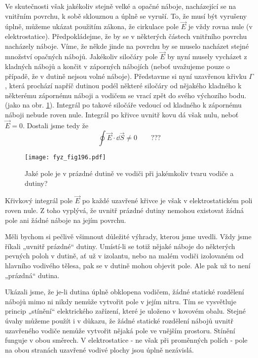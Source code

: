 {  Ve skutečnosti však jakékoliv stejně velké a opačné náboje, nacházející se na vnitřním 
  povrchu, k sobě sklouznou a úplně se vyruší. To, že musí být vyrušeny úplně, můžeme ukázat 
  použitím zákona, že cirkulace pole \(\vec{E}\) je vždy rovna nule (v elektrostatice). 
  Předpokládejme, že by se v některých částech vnitřního povrchu nacházely náboje. Víme, že 
  někde jinde na povrchu by se muselo nacházet stejné množství  opačných nábojů. Jakékoliv 
  siločáry pole \(\vec{E}\) by nyní musely vycházet z kladných nábojů a končit v záporných 
  nábojích (neboť uvažujeme pouze o případě, že v dutině nejsou volné náboje). Představme si 
  nyní uzavřenou křivku \(\Gamma\), která prochází napříč dutinou podél některé siločáry od 
  nějakého kladného k některému zápornému náboji a vodičem se vrací zpět do svého výchozího 
  bodu. (jako na obr. \ref{fyz:fig196}). Integrál po takové siločáře vedoucí od kladného k 
  zápornému náboji nebude roven nule. Integrál po křivce uvnitř kovu dá však nulu, 
  neboť \(\vec{E}=0\). Dostali jsme tedy že
  \begin{equation}\label{fyz:eq_fey_elstat_gauss08}
    \oint \vec{E}\cdot\dd{\vec{S}} \neq 0  \qquad ???
  \end{equation}

  \begin{figure}[ht!] %
    \centering
    \texttt{[image: fyz\_fig196.pdf]}
    \caption{Jaké pole je v prázdné dutině ve vodiči při jakémkoliv tvaru vodiče a dutiny?}
    \label{fyz:fig196}
  \end{figure}
  Křivkový integrál pole \(\vec{E}\) po každé uzavřené křivce je však v elektrostatickém poli 
  roven nule. Z toho vyplývá, že uvnitř prázdné dutiny nemohou existovat žádná pole ani žádné 
  náboje na jejím povrchu.
  
  Měli bychom si pečlivě všimnout důležité výhrady, kterou jsme uvedli. Vždy jsme říkali 
  „uvnitř prázdné“ dutiny. Umístí-li se totiž nějaké náboje do některých pevných poloh v 
  dutině, ať už v izolantu, nebo na malém vodiči izolovaném od hlavního vodivého tělesa, pak se 
  v dutině mohou objevit pole. Ale pak už to není „prázdná“ dutina.
  
  Ukázali jsme, že je-li dutina úplně obklopena vodičem, žádné statické rozdělení nábojů mimo 
  ni nikdy nemůže vytvořit pole v jejím nitru. Tím se vysvětluje princip „stínění“ elektrického 
  zařízení, které je uloženo v kovovém obalu. Stejné úvahy můžeme použít i v důkazu, že žádné 
  statické rozdělení nábojů uvnitř uzavřeného vodiče nemůže vytvořit nějaká pole ve vnějším 
  prostoru. Stínění funguje v obou směrech. V elektrostatice - ne však při proměnných polích - 
  pole na obou stranách uzavřené vodivé plochy jsou úplně nezávislá.
  
}
